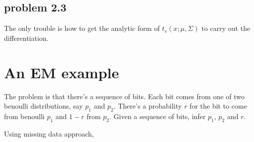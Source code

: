 \documentclass[a4paper,10pt]{article}
\begin{document}
\subsection{problem 2.3}
The only trouble is how to get the analytic form of $t_v(x; \mu, \Sigma)$ to carry out the differentiation.

\section{An EM example}
The problem is that there's a sequence of bits. Each bit comes from one of two benoulli distributions, say $p_1$ and $p_2$. There's a probability $r$ for the bit to come from benoulli $p_1$ and $1-r$ from $p_2$. Given a sequence of bits, infer $p_1$, $p_2$ and $r$.

Using missing data approach,
\end{document}
